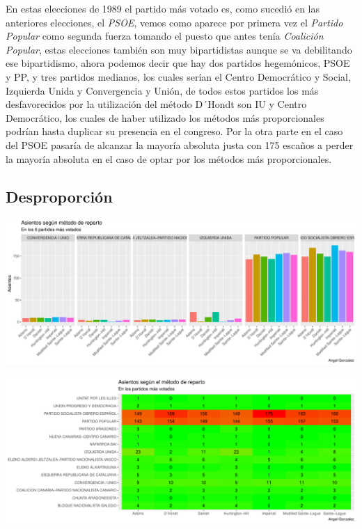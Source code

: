 \documentclass[12pt,a4paper,]{book}
\numberwithin{dummy}{section}
\theoremstyle{ocrenumbox}
\theoremstyle{blacknumex}
\theoremstyle{blacknumbox}
\theoremstyle{ocrenum}
\theoremstyle{ocrenum}
\begin{document}
En estas elecciones de 1989 el partido más votado es, como sucedió en
las anteriores elecciones, el \emph{PSOE}, vemos como aparece por
primera vez el \emph{Partido Popular} como segunda fuerza tomando el
puesto que antes tenía \emph{Coalición Popular}, estas elecciones
también son muy bipartidistas aunque se va debilitando ese bipartidismo,
ahora podemos decir que hay dos partidos hegemónicos, PSOE y PP, y tres
partidos medianos, los cuales serían el Centro Democrático y Social,
Izquierda Unida y Convergencia y Unión, de todos estos partidos los más
desfavorecidos por la utilización del método D´Hondt son IU y Centro
Democrático, los cuales de haber utilizado los métodos más
proporcionales podrían hasta duplicar su presencia en el congreso. Por
la otra parte en el caso del PSOE pasaría de alcanzar la mayoría
absoluta justa con 175 escaños a perder la mayoría absoluta en el caso
de optar por los métodos más proporcionales.

\hypertarget{desproporciuxf3n-4}{%
\subsection{Desproporción}\label{desproporciuxf3n-4}}

\begin{center}\includegraphics[width=1\linewidth]{figurasR/unnamed-chunk-91-1} \end{center}

\begin{center}\includegraphics[width=1\linewidth]{figurasR/unnamed-chunk-91-2} \end{center}
\end{document}

